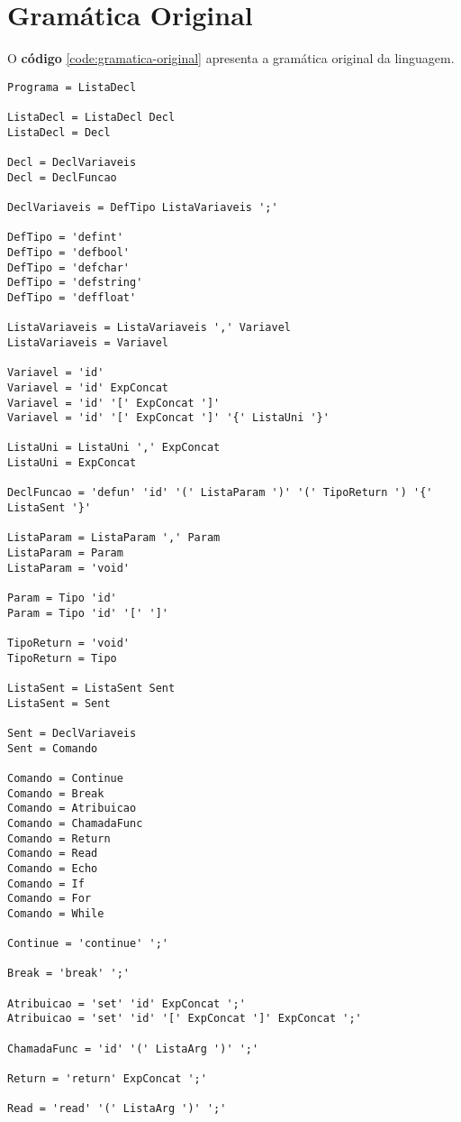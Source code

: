 \documentclass[
  12pt,				%
  oneside,			%
  a4paper,			%
  english,			%
  french,				%
  spanish,			%
  brazil,				%
]{abntex2}
\begin{document}
\chapter{Gramática Original}
\label{cha:gramatica-original}
O \textbf{código} \ref{code:gramatica-original} apresenta a gramática
original da linguagem.

\begin{lstlisting}[label={code:gramatica-original},caption={Gramática
    original da linguagem de programação LisC.},style={mystyle}]
Programa = ListaDecl

ListaDecl = ListaDecl Decl
ListaDecl = Decl

Decl = DeclVariaveis
Decl = DeclFuncao

DeclVariaveis = DefTipo ListaVariaveis ';'

DefTipo = 'defint'
DefTipo = 'defbool'
DefTipo = 'defchar'
DefTipo = 'defstring'
DefTipo = 'deffloat'

ListaVariaveis = ListaVariaveis ',' Variavel
ListaVariaveis = Variavel

Variavel = 'id'
Variavel = 'id' ExpConcat
Variavel = 'id' '[' ExpConcat ']'
Variavel = 'id' '[' ExpConcat ']' '{' ListaUni '}'

ListaUni = ListaUni ',' ExpConcat
ListaUni = ExpConcat

DeclFuncao = 'defun' 'id' '(' ListaParam ')' '(' TipoReturn ') '{' ListaSent '}'

ListaParam = ListaParam ',' Param
ListaParam = Param
ListaParam = 'void'

Param = Tipo 'id'
Param = Tipo 'id' '[' ']'

TipoReturn = 'void'
TipoReturn = Tipo

ListaSent = ListaSent Sent
ListaSent = Sent

Sent = DeclVariaveis
Sent = Comando

Comando = Continue
Comando = Break
Comando = Atribuicao
Comando = ChamadaFunc
Comando = Return
Comando = Read
Comando = Echo
Comando = If
Comando = For
Comando = While

Continue = 'continue' ';'

Break = 'break' ';'

Atribuicao = 'set' 'id' ExpConcat ';'
Atribuicao = 'set' 'id' '[' ExpConcat ']' ExpConcat ';'

ChamadaFunc = 'id' '(' ListaArg ')' ';'

Return = 'return' ExpConcat ';'

Read = 'read' '(' ListaArg ')' ';'


\end{lstlisting}
\end{document}
